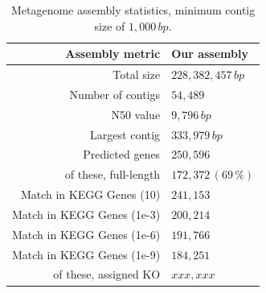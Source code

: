 \documentclass{bmcart}
\begin{document}
\begin{backmatter}
\begin{table}[h!]
\caption{Metagenome assembly statistics, minimum contig size of $1,000\,bp$.}
\begin{tabular}{rl}
\hline
Assembly metric & Our assembly\\
\hline
Total size & $228,382,457\,bp$\\
Number of contigs & $54,489$\\
N50 value & $9,796\,bp$\\
Largest contig & $333,979\,bp$\\
\hline
Predicted genes & $250,596$\\
of these, full-length & $172,372\,(69\,\%)$\\
Match in KEGG Genes (10) & $241,153$\\
Match in KEGG Genes (1e-3) & $200,214$\\
Match in KEGG Genes (1e-6) & $191,766$\\
Match in KEGG Genes (1e-9) & $184,251$\\
of these, assigned KO & $xxx,xxx$\\
\hline
\end{tabular}
\label{tAssembly}
\end{table}


%


\end{backmatter}
\end{document}
